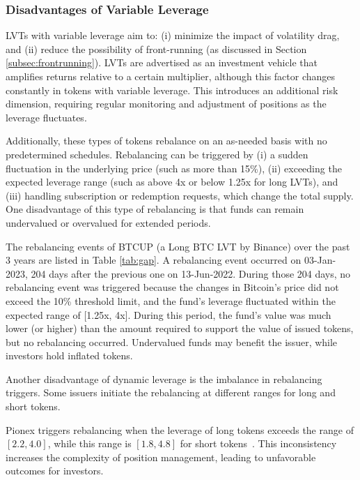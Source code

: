 \subsubsection{Disadvantages of Variable Leverage}
LVTs with variable leverage aim to: (i) minimize the impact of volatility drag, and (ii) reduce the possibility of front-running (as discussed in Section \ref{subsec:frontrunning}). LVTs are advertised as an investment vehicle that amplifies returns relative to a certain multiplier, although this factor changes constantly in tokens with variable leverage. This introduces an additional risk dimension, requiring regular monitoring and adjustment of positions as the leverage fluctuates. 

Additionally, these types of tokens rebalance on an as-needed basis with no predetermined schedules. Rebalancing can be triggered by (i) a sudden fluctuation in the underlying price (such as more than 15\%), (ii) exceeding the expected leverage range (such as above 4x or below 1.25x for long LVTs), and (iii) handling subscription or redemption requests, which change the total supply. One disadvantage of this type of rebalancing is that funds can remain undervalued or overvalued for extended periods.


\begin{example}
	The rebalancing events of BTCUP (a Long BTC LVT by Binance) over the past 3 years are listed in Table \ref{tab:gap}. A rebalancing event occurred on 03-Jan-2023, 204 days after the previous one on 13-Jun-2022. During those 204 days, no rebalancing event was triggered because the changes in Bitcoin’s price did not exceed the 10\% threshold limit, and the fund’s leverage fluctuated within the expected range of [1.25x, 4x]. During this period, the fund’s value was much lower (or higher) than the amount required to support the value of issued tokens, but no rebalancing occurred. Undervalued funds may benefit the issuer, while investors hold inflated tokens.
\end{example}

Another disadvantage of dynamic leverage is the imbalance in rebalancing triggers. Some issuers initiate the rebalancing at different ranges for long and short tokens.
\begin{example}
	Pionex triggers rebalancing when the leverage of long tokens exceeds the range of $\left[2.2, 4.0\right]$, while this range is $\left[1.8, 4.8\right]$ for short tokens~\cite{Pionex}. This inconsistency increases the complexity of position management, leading to unfavorable outcomes for investors.
\end{example}

